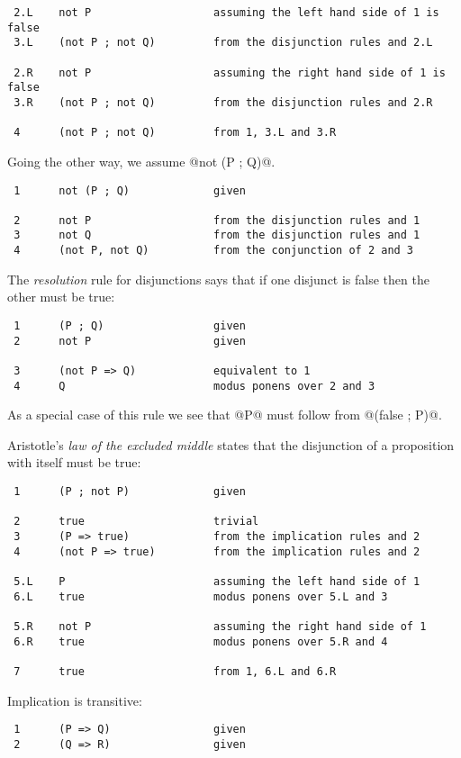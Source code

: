 \begin{itemize}
\begin{verbatim}
 2.L    not P                   assuming the left hand side of 1 is false
 3.L    (not P ; not Q)         from the disjunction rules and 2.L

 2.R    not P                   assuming the right hand side of 1 is false
 3.R    (not P ; not Q)         from the disjunction rules and 2.R

 4      (not P ; not Q)         from 1, 3.L and 3.R
\end{verbatim}
Going the other way, we assume @not (P ; Q)@.
\begin{verbatim}
 1      not (P ; Q)             given

 2      not P                   from the disjunction rules and 1
 3      not Q                   from the disjunction rules and 1
 4      (not P, not Q)          from the conjunction of 2 and 3
\end{verbatim}

The \emph{resolution} rule for disjunctions says that if one disjunct is
false then the other must be true:
\begin{verbatim}
 1      (P ; Q)                 given
 2      not P                   given

 3      (not P => Q)            equivalent to 1
 4      Q                       modus ponens over 2 and 3
\end{verbatim}
As a special case of this rule we see that @P@ must follow from
@(false ; P)@.

Aristotle's \emph{law of the excluded middle} states that the
disjunction of a proposition with itself must be true:
\begin{verbatim}
 1      (P ; not P)             given

 2      true                    trivial
 3      (P => true)             from the implication rules and 2
 4      (not P => true)         from the implication rules and 2

 5.L    P                       assuming the left hand side of 1
 6.L    true                    modus ponens over 5.L and 3

 5.R    not P                   assuming the right hand side of 1
 6.R    true                    modus ponens over 5.R and 4

 7      true                    from 1, 6.L and 6.R
\end{verbatim}

Implication is transitive:
\begin{verbatim}
 1      (P => Q)                given
 2      (Q => R)                given


\end{verbatim}
\end{itemize}
